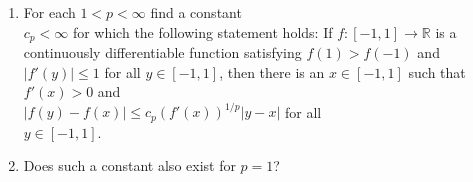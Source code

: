 \documentclass{article}
\begin{document}
	\setlength{\parindent}{0pt}
	\begin{enumerate}[label=\alph*)]
		\item For each $1<p<\infty$ find a constant \\
		$c_p<\infty$ for which the following statement holds: If $f:[-1,1]\to\mathbb{R}$ is a continuously differentiable function satisfying $f(1)>f(-1)$ and $\lvert f'(y)\rvert\leq 1$ for all $y\in[-1,1]$, then there is an $x\in[-1,1]$ such that $f'(x)>0$ and\\
		$\lvert f(y)-f(x)\rvert\leq c_p(f'(x))^{1/p}\lvert y-x\rvert$ for all\\
		$y\in[-1,1]$.
		\item Does such a constant also exist for $p=1$?
	\end{enumerate}
\end{document}

